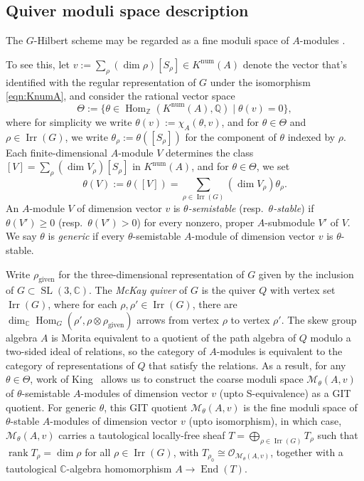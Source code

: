 \documentclass[11pt,reqno]{amsart}
\numberwithin{equation}{section}
\theoremstyle{definition}
\newcommand{\CC}{\ensuremath{\mathbb{C}}}
\newcommand{\QQ}{\ensuremath{\mathbb{Q}}}
\newcommand{\ZZ}{\ensuremath{\mathbb{Z}}}
\newcommand{\End}{\operatorname{End}}
\newcommand{\Hom}{\operatorname{Hom}}
\newcommand{\0}{\operatorname{0}}
\newcommand{\Irr}{\operatorname{Irr}}
\newcommand{\Knum}{K^{\operatorname{num}}}
\newcommand{\SL}{\operatorname{SL}}
\begin{document}
 

 \subsection{Quiver moduli space description}
 The $G$-Hilbert scheme may be regarded as a fine moduli space of $A$-modules
 \cite{ItoNakajima00,Crawthesis}. 
 
 To see this, let $v:=\sum_\rho (\dim\rho)[S_\rho]\in \Knum(A)$ denote the vector that's identified with the regular representation of $G$ under the isomorphism  
 \eqref{eqn:KnumA}, and consider the rational vector space 
   \[
   \Theta:= \big\{\theta\in \Hom_{\ZZ}(\Knum(A), \QQ) \mid \theta(v)=0\big\},
   \]
   where for simplicity we write $\theta(v):= \chi_A(\theta,v)$, and for $\theta\in \Theta$ and $\rho\in \Irr(G)$, we write $\theta_\rho:= \theta([S_\rho])$ for the component of $\theta$ indexed by $\rho$. Each finite-dimensional $A$-module $V$ determines the class $[V]=\sum_\rho (\dim V_\rho) [S_\rho]$ in $\Knum(A)$, and for $\theta\in \Theta$, we set
   \[
   \theta(V):=\theta([V]) = \sum_{\rho\in \Irr(G)}  (\dim V_\rho)\theta_\rho.\]
   An $A$-module $V$ of dimension vector $v$ is \emph{$\theta$-semistable} (resp.\ \emph{$\theta$-stable}) if  $\theta(V')\geq 0$ (resp.\ $\theta(V')>0$) for every nonzero, proper $A$-submodule $V'$ of $V$. We say $\theta$ is \emph{generic} if every $\theta$-semistable $A$-module of dimension vector $v$ is $\theta$-stable.

  Write $\rho_{\text{given}}$ for the three-dimensional representation of $G$ given by the inclusion of $G\subset \SL(3,\CC)$. The \emph{McKay quiver} of $G$ is the quiver $Q$ with vertex set $\Irr(G)$, where for each $\rho, \rho'\in \Irr(G)$, there are $\dim_{\mathbb{C}}\Hom_G(\rho', \rho\otimes \rho_{\text{given}})$ arrows from vertex $\rho$ to vertex $\rho'$.  The skew group algebra $A$ is Morita equivalent to a quotient of the path algebra of $Q$ modulo a two-sided ideal of relations, so the category of $A$-modules is equivalent to the category of representations of $Q$ that satisfy the relations. As a result, for any $\theta\in \Theta$, work of King~\cite{King94} allows us to construct the coarse moduli space $\mathcal{M}_\theta(A,v)$ of $\theta$-semistable $A$-modules of dimension vector $v$ (upto S-equivalence) as a GIT quotient. For generic $\theta$, this GIT quotient $\mathcal{M}_\theta(A,v)$ is the fine moduli space of $\theta$-stable $A$-modules of dimension vector $v$ (upto isomorphism), in which case, $\mathcal{M}_\theta(A,v)$ carries a tautological locally-free sheaf $T=\bigoplus_{\rho\in \Irr(G)} T_\rho$ such that $\operatorname{rank} T_\rho=\dim \rho$ for all $\rho\in \Irr(G)$, with $T_{\rho_0}\cong \mathcal{O}_{\mathcal{M}_\theta(A,v)}$, together with a tautological $\CC$-algebra homomorphism $A\to \End(T)$.
  
\end{document}
